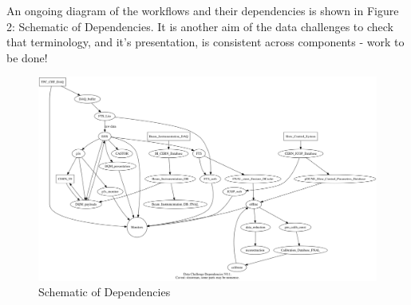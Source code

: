 \documentclass[pdftex,12pt,letter]{article}
\begin{document}
An ongoing diagram of the workflows and their dependencies is shown in Figure 2: Schematic of Dependencies. It is another aim of the data challenges to check that terminology, and it's presentation, is consistent across components - work to be done!

\begin{figure}[tbh]
  \centering
  \includegraphics[width=1.0\textwidth]{integration.gif}
  \caption{Schematic of Dependencies}
  \label{fig:dependencies}
\end{figure}
\end{document}
